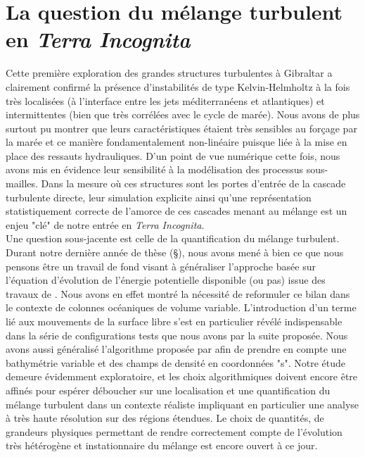 \section{La question du mélange turbulent en \textit{Terra Incognita}}
Cette première exploration des grandes structures turbulentes à Gibraltar a clairement confirmé la présence d'instabilités de type Kelvin-Helmholtz à la fois très localisées (à l'interface entre les jets méditerranéens et atlantiques) et intermittentes (bien que très corrélées avec le cycle de marée). Nous avons de plus surtout pu montrer que leurs caractéristiques étaient très sensibles au forçage par la marée et ce manière fondamentalement non-linéaire puisque liée à la mise en place des ressauts hydrauliques. D'un point de vue numérique cette fois, nous avons mis en évidence leur sensibilité à la modélisation des processus sous-mailles.
\color{blue}
Dans la mesure où ces structures sont les portes d'entrée de la cascade turbulente directe, leur simulation explicite ainsi qu'une représentation statistiquement correcte  de l'amorce de ces cascades menant au mélange est un enjeu "clé" de notre entrée en \textit{Terra Incognita}.\\
\color{black}
Une question sous-jacente est celle de la quantification du mélange turbulent. Durant notre dernière année de thèse (\S {}), nous avons mené à bien ce que nous pensons être un travail de fond visant à généraliser l'approche basée sur l'équation d'évolution de l'énergie potentielle disponible (ou pas) issue des travaux de \cite{lorenz_available_1955}. Nous avons en effet montré la nécessité de reformuler ce bilan dans le contexte de colonnes océaniques de volume variable. L'introduction d'un terme lié aux mouvements de la surface libre s'est en particulier révélé indispensable dans la série de configurations tests que nous avons par la suite proposée. Nous avons aussi généralisé l'algorithme proposée par \cite{winters_available_1995} afin de prendre en compte une bathymétrie variable et des champs de densité en coordonnées "s". Notre étude demeure évidemment exploratoire, et les choix algorithmiques doivent encore être affinés pour espérer déboucher sur une localisation et une quantification du mélange turbulent dans un contexte réaliste impliquant en particulier une analyse à très haute résolution sur des régions étendues. Le choix de quantités, de grandeurs physiques permettant de rendre correctement compte de l'évolution très hétérogène et instationnaire du mélange est encore ouvert à ce jour.
